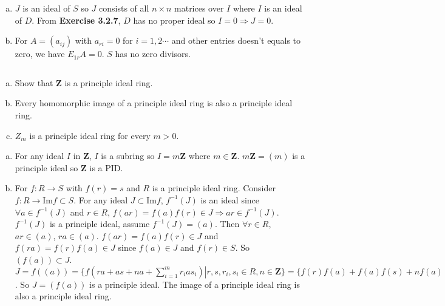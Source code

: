 \begin{answer}
    \begin{enumerate}[(a)]
        \item $J$ is an ideal of $S$ so $J$ consists of all $n\times n$ matrices over $I$ where $I$ is an ideal of $D$. From \textbf{Exercise 3.2.7}, $D$ has no proper ideal so $I=0\Rightarrow J=0$.
        \item For $A=(a_{ij})$ with $a_{ri}=0$ for $i=1,2\cdots$ and other entries doesn't equals to zero, we have $E_{1r}A=0$. $S$ has no zero divisors.
    \end{enumerate}
\end{answer}

$$ $$

\begin{ex}
    \begin{enumerate}[(a)]
        \item Show that $\mathbf{Z}$ is a principle ideal ring.
        \item Every homomorphic image of a principle ideal ring is also a principle ideal ring.
        \item $Z_{m}$ is a principle ideal ring for every $m>0$.
    \end{enumerate}
\end{ex}

\begin{answer}
    \begin{enumerate}[(a)]
        \item For any ideal $I$ in $\mathbf{Z}$, $I$ is a subring so $I=m\mathbf{Z}$ where $m\in \mathbf{Z}$. $m\mathbf{Z}=(m)$ is a principle ideal so $\mathbf{Z}$ is a PID.
        \item For $f:R\to S$ with $f(r)=s$ and $R$ is a principle ideal ring. Consider $f:R\to \mathrm{Im}f\subset S$. For any ideal $J\subset \mathrm{Im}f$, $f^{-1}(J)$ is an ideal since $\forall a\in f^{-1}(J)$ and $r\in R$, $f(ar)=f(a)f(r)\in J\Rightarrow ar\in f^{-1}(J)$. $f^{-1}(J)$ is a principle ideal, assume $f^{-1}(J)=(a)$. Then $\forall r\in R$, $ar\in (a)$, $ra\in (a)$. $f(ar)=f(a)f(r)\in J$ and $f(ra)=f(r)f(a)\in J$ since $f(a)\in J$ and $f(r)\in S$. So $(f(a))\subset J$. $J=f((a))=\{f(ra+as+na+\sum\limits_{i=1}^{m}r_{i}as_{i})| r, s, r_{i}, s_{i}\in R, n\in \mathbf{Z}\}=\{f(r)f(a)+f(a)f(s)+nf(a)+\sum\limits_{i=1}^{m}f(r_{i})f(a_{i})f(s_{i})| r, s, r_{i}, s_{i}\in R, n\in \mathbf{Z}\}\subset (f(a))$. So $J=(f(a))$ is a principle ideal. The image of a principle ideal ring is also a principle ideal ring.
    \end{enumerate}
\end{answer}

